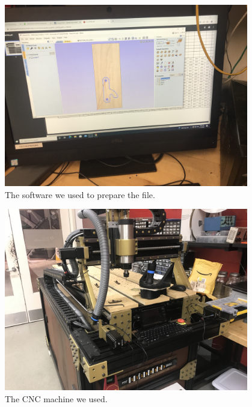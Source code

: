 \begin{figure}[htp]
\centering
\includegraphics[width=0.95\textwidth, angle=0]{Meetings/March/03-14-22/03-14-22 2.JPG}
\caption{The software we used to prepare the file.}
\label{fig:031022_2}
\end{figure}

\begin{figure}[htp]
\centering
\includegraphics[width=0.95\textwidth, angle=0]{Meetings/March/03-14-22/03-14-22 3.JPG}
\caption{The CNC machine we used.}
\label{fig:031022_3}
\end{figure}

